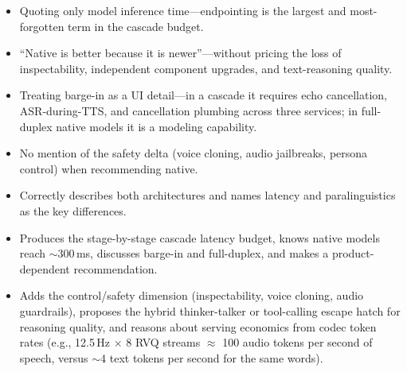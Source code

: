 \begin{interviewq}
\redflags
\begin{itemize}
    \item Quoting only model inference time---endpointing is the largest and most-forgotten term in the cascade budget.
    \item ``Native is better because it is newer''---without pricing the loss of inspectability, independent component upgrades, and text-reasoning quality.
    \item Treating barge-in as a UI detail---in a cascade it requires echo cancellation, ASR-during-TTS, and cancellation plumbing across three services; in full-duplex native models it is a modeling capability.
    \item No mention of the safety delta (voice cloning, audio jailbreaks, persona control) when recommending native.
\end{itemize}


\goodgreat
\begin{itemize}
    \item {} Correctly describes both architectures and names latency and paralinguistics as the key differences.
    \item {} Produces the stage-by-stage cascade latency budget, knows native models reach $\sim$300\,ms, discusses barge-in and full-duplex, and makes a product-dependent recommendation.
    \item {} Adds the control/safety dimension (inspectability, voice cloning, audio guardrails), proposes the hybrid thinker-talker or tool-calling escape hatch for reasoning quality, and reasons about serving economics from codec token rates (e.g., 12.5\,Hz $\times$ 8 RVQ streams $\approx$ 100 audio tokens per second of speech, versus $\sim$4 text tokens per second for the same words).
\end{itemize}

\end{interviewq}

